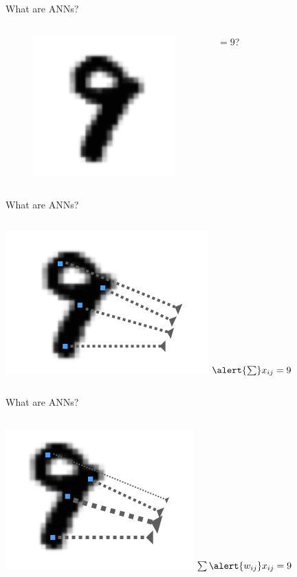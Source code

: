 \documentclass[10pt]{beamer}
\begin{document}
\begin{frame}[fragile]{What are ANNs?}
\begin{columns}
\begin{figure}
    \centering
    \includegraphics[scale=0.5]{images/nine_only.png} 
\end{figure}
\centering
 $= 9$?
\end{columns}
\end{frame}


\begin{frame}[fragile]{What are ANNs?}
\begin{columns}
\centering
\includegraphics[scale=0.5]{images/nine_x.png} 
\centering
 $\alert{\sum} x_{ij} = 9$
\end{columns}
\end{frame}

\begin{frame}[fragile]{What are ANNs?}
\begin{columns}
\centering
\includegraphics[scale=0.5]{images/nine_wx.png} 
\centering
 $\sum \alert{w_{ij}} x_{ij} = 9$
\end{columns}
\end{frame}
\end{document}

